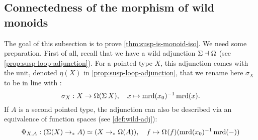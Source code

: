 \documentclass[english,a4paper]{lmcs}
\begin{document}
\subsection{Connectedness of the morphism of wild monoids}
%
The goal of this subsection is to prove \cref{thm:susp-is-monoid-iso}. We need
some preparation.  First of all, recall that we have a wild adjunction $\operatorname{\Sigma}
\dashv \Omega$ (see \cref{prop:susp-loop-adjunction}).
%
For a pointed type $X$, this adjunction comes with the unit, denoted $\eta(X)$
in \cref{prop:susp-loop-adjunction}, that we rename here $\sigma_X$ to be in line
with \cite{HoTT}:
\begin{equation}  \label{eq:sigma}
  \sigma_X : X \to \Omega(\operatorname{\Sigma} X), \quad x \mapsto \operatorname{\mathrm{mrd}}(x_0)^{-1} \operatorname{\mathrm{mrd}}(x).
\end{equation}
If $A$ is a second pointed type, the adjunction can also be described via an
equivalence of function spaces (see \cref{def:wild-adj}):
\begin{equation}\label{eq:adj-equivalence-susp-loopspace}
  \Phi_{X,A} : (\susp(X) \ptdto A) \simeq (X \ptdto \Omega(A)),\quad
  f \mapsto \loopspace \null (f)(\inv{\mrd (x_0)} \mrd(\blank))
\end{equation}
\end{document}
